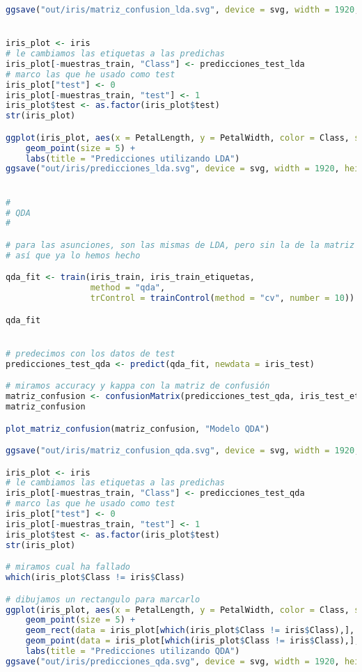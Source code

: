 \begin{lstlisting}[language=R]
ggsave("out/iris/matriz_confusion_lda.svg", device = svg, width = 1920, height = 1080, units = "px", dpi = 150)


iris_plot <- iris
# le cambiamos las etiquetas a las predichas
iris_plot[-muestras_train, "Class"] <- predicciones_test_lda
# marco las que he usado como test
iris_plot["test"] <- 0
iris_plot[-muestras_train, "test"] <- 1
iris_plot$test <- as.factor(iris_plot$test)
str(iris_plot)

ggplot(iris_plot, aes(x = PetalLength, y = PetalWidth, color = Class, shape = test)) +
	geom_point(size = 5) +
	labs(title = "Predicciones utilizando LDA")
ggsave("out/iris/predicciones_lda.svg", device = svg, width = 1920, height = 1080, units = "px", dpi = 150)


#
# QDA
#

# para las asunciones, son las mismas de LDA, pero sin la de la matriz de covarianza
# así que ya lo hemos hecho

qda_fit <- train(iris_train, iris_train_etiquetas,
				 method = "qda",
				 trControl = trainControl(method = "cv", number = 10))

qda_fit


# predecimos con los datos de test
predicciones_test_qda <- predict(qda_fit, newdata = iris_test)

# miramos accuracy y kappa con la matriz de confusión
matriz_confusion <- confusionMatrix(predicciones_test_qda, iris_test_etiquetas)
matriz_confusion

plot_matriz_confusion(matriz_confusion, "Modelo QDA")

ggsave("out/iris/matriz_confusion_qda.svg", device = svg, width = 1920, height = 1080, units = "px", dpi = 150)

iris_plot <- iris
# le cambiamos las etiquetas a las predichas
iris_plot[-muestras_train, "Class"] <- predicciones_test_qda
# marco las que he usado como test
iris_plot["test"] <- 0
iris_plot[-muestras_train, "test"] <- 1
iris_plot$test <- as.factor(iris_plot$test)
str(iris_plot)

# miramos cual ha fallado
which(iris_plot$Class != iris$Class)

# dibujamos un rectangulo para marcarlo
ggplot(iris_plot, aes(x = PetalLength, y = PetalWidth, color = Class, shape = test)) +
	geom_point(size = 5) +
	geom_rect(data = iris_plot[which(iris_plot$Class != iris$Class),], aes(xmin = PetalLength - 0.03, xmax = PetalLength + 0.03, ymin = PetalWidth - 0.05, ymax = PetalWidth + 0.05)) +
	geom_point(data = iris_plot[which(iris_plot$Class != iris$Class),], size = 5) +
	labs(title = "Predicciones utilizando QDA")
ggsave("out/iris/predicciones_qda.svg", device = svg, width = 1920, height = 1080, units = "px", dpi = 150)





\end{lstlisting}
